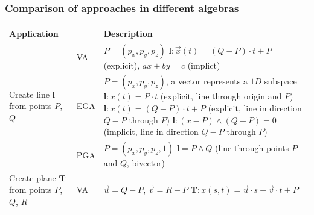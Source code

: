\newpage

\subsubsection{Comparison of approaches in different algebras}

\newlength{\cwApp}\setlength{\cwApp}{0.185\textwidth}
\newlength{\cwTag}\setlength{\cwTag}{0.07\textwidth}
\newlength{\cwDesc}\setlength{\cwDesc}{\dimexpr\textwidth - \cwApp - \cwTag
                                       - 4\arrayrulewidth - 6\tabcolsep\relax}
\begin{table}[H]
{\setlength{\extrarowheight}{2pt}\renewcommand{\arraystretch}{1.15}%
\begin{tabular}{|p{\cwApp}|p{\cwTag}|p{\cwDesc}|}
    \hline
    \textbf{Application} & & \textbf{Description} \\
    \hline \hline
    \multirow{3}{\cwApp}{Create line $\bm{l}$ from points \newline
    $P$, $Q$} & VA  & $P=(p_x,p_y,p_z)$
    $\bm{l}\colon \vec{x}(t) = (Q-P) \cdot t + P$ (explicit),
    $ax+by=c$ (implict) \\
    \cline{2-3}
    & EGA & $P=(p_x,p_y,p_z)$, a vector represents a $1D$ subspace\newline
    $\bm{l}\colon x(t)=P \cdot t$ (explicit, line through origin and $P$)\newline
    $\bm{l}\colon x(t)=(Q-P) \cdot t + P$\newline
    (explicit, line in direction $Q-P$ through $P$)\newline
    $\bm{l}\colon(x-P) \wedge (Q-P) = 0$ \newline
    (implicit, line in direction $Q-P$ through $P$)\\
    \cline{2-3}
    & PGA & $P=(p_x,p_y,p_z,1)$ \newline
    $\bm{l} = P \wedge Q$ (line through points $P$ and $Q$, bivector)\\
    \hline \hline
    \multirow{3}{\cwApp}{Create plane $\bm{T}$ from points $P$, $Q$, $R$}
    & VA  & $\vec{u} = Q - P$, $\vec{v} = R - P$ \newline
            $\bm{T}\colon x(s,t) = \vec{u} \cdot s + \vec{v} \cdot t + P$ \\

\end{tabular}}
\end{table}
